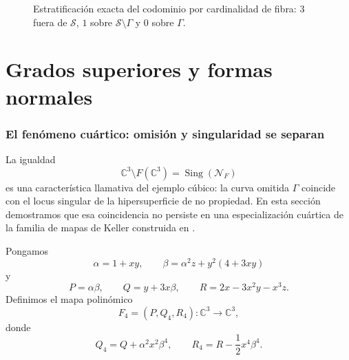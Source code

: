 \documentclass[11pt]{article}
\theoremstyle{definition}
\theoremstyle{remark}
\newcommand{\C}{\mathbb{C}}
\newcommand{\Sing}{\operatorname{Sing}}
\begin{document}
\begin{figure}[htbp]
\centering
{}
\caption{Estratificaci\'on exacta del codominio por cardinalidad de fibra:
$3$ fuera de $\mathcal S$, $1$ sobre $\mathcal S\setminus\Gamma$ y $0$ sobre
$\Gamma$.}
\label{fig:fiber-stratification}
\end{figure}

\clearpage
\part{Grados superiores y formas normales}

\section{El fen\'omeno cu\'artico: omisi\'on y singularidad se separan}
\label{sec:quartic}

La igualdad
\[
\C^3\setminus F(\C^3)=\Sing(\mathcal N_F)
\]
es una caracter\'istica llamativa del ejemplo c\'ubico: la curva omitida
$\Gamma$ coincide con el locus singular de la hipersuperficie de no
propiedad. En esta secci\'on demostramos que esa coincidencia no persiste en
una especializaci\'on cu\'artica de la familia de mapas de Keller construida en
\cite{CounterexampleNote2026}.

Pongamos
\begin{equation}\label{eq:quartic-ab}
\alpha=1+xy,\qquad
\beta=\alpha^2z+y^2(4+3xy)
\end{equation}
y
\[
P=\alpha\beta,\qquad
Q=y+3x\beta,\qquad
R=2x-3x^2y-x^3z.
\]
Definimos el mapa polin\'omico
\begin{equation}\label{eq:F4}
F_4=(P,Q_4,R_4)\colon\C^3\longrightarrow\C^3,
\end{equation}
donde
\begin{equation}\label{eq:F4-coordinates}
Q_4=Q+\alpha^2x^2\beta^4,
\qquad
R_4=R-\frac12x^4\beta^4.
\end{equation}
\end{document}
